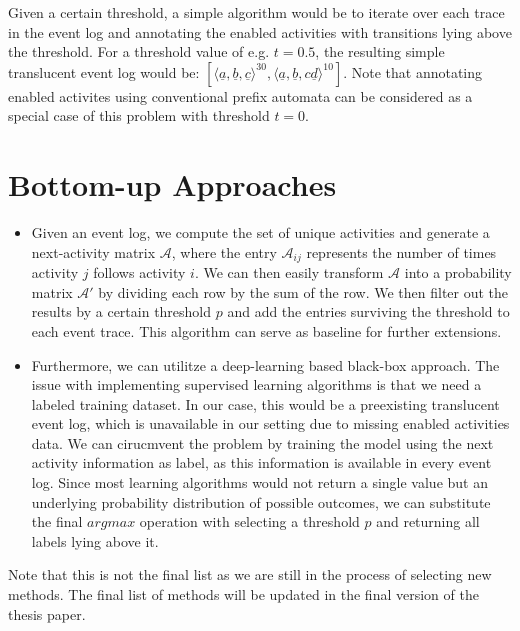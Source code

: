 Given a certain threshold, a simple algorithm would be to iterate over each trace in the event log and annotating the enabled activities with transitions lying above the threshold. For a threshold value of e.g. $t = 0.5$, the resulting simple translucent event log would be: $[\langle \underline{a}, \underline{b}, \underline{c} \rangle^{30}, \langle \underline{a}, \underline{b}, c\underline{d}\rangle^{10}]$. Note that annotating enabled activites using conventional prefix automata can be considered as a special case of this problem with threshold $t = 0$.









\section{Bottom-up Approaches}

\begin{itemize}
    \item Given an event log, we compute the set of unique activities and generate a next-activity matrix $\mathcal{A}$, where the entry $\mathcal{A}_{ij}$ represents the number of times activity $j$ follows activity $i$. We can then easily transform $\mathcal{A}$ into a probability matrix $\mathcal{A'}$ by dividing each row by the sum of the row. We then filter out the results by a certain threshold $p$ and add the entries surviving the threshold to each event trace. This algorithm can serve as baseline for further extensions.
    \item Furthermore, we can utilitze a deep-learning based black-box approach. The issue with implementing supervised learning algorithms is that we need a labeled training dataset. In our case, this would be a preexisting translucent event log, which is unavailable in our setting due to missing enabled activities data. We can cirucmvent the problem by training the model using the next activity information as label, as this information is available in every event log. Since most learning algorithms would not return a single value but an underlying probability distribution of possible outcomes, we can substitute the final $\mathit{argmax}$ operation with selecting a threshold $p$ and returning all labels lying above it.
\end{itemize}

Note that this is not the final list as we are still in the process of selecting new methods. The final list of methods will be updated in the final version of the thesis paper.



